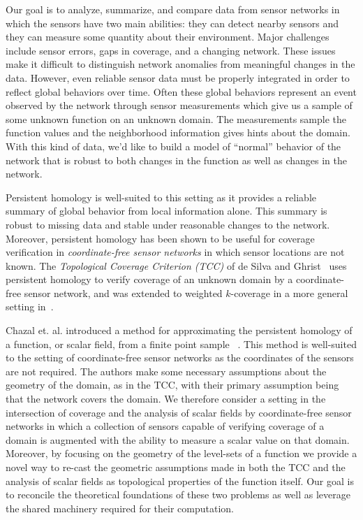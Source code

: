 Our goal is to analyze, summarize, and compare data from sensor networks in which the sensors have two main abilities: they can detect nearby sensors and they can measure some quantity about their environment.
Major challenges include sensor errors, gaps in coverage, and a changing network.
These issues make it difficult to distinguish network anomalies from meaningful changes in the data.
However, even reliable sensor data must be properly integrated in order to reflect global behaviors over time.
Often these global behaviors represent an event observed by the network through sensor measurements which give us a sample of some unknown function on an unknown domain.
The measurements sample the function values and the neighborhood information gives hints about the domain.
With this kind of data, we'd like to build a model of ``normal'' behavior of the network that is robust to both changes in the function as well as changes in the network.

Persistent homology is well-suited to this setting as it provides a reliable summary of global behavior from local information alone.
This summary is robust to missing data and stable under reasonable changes to the network.
Moreover, persistent homology has been shown to be useful for coverage verification in \emph{coordinate-free sensor networks} in which sensor locations are not known.
The \emph{Topological Coverage Criterion (TCC)} of de Silva and Ghrist~\cite{desilva07coverage} uses persistent homology to verify coverage of an unknown domain by a coordinate-free sensor network, and was extended to weighted $k$-coverage in a more general setting in~\cite{cavanna2017when}.

Chazal et. al. introduced a method for approximating the persistent homology of a function, or scalar field, from a finite point sample~\cite{chazal09analysis} .
This method is well-suited to the setting of coordinate-free sensor networks as the coordinates of the sensors are not required.
The authors make some necessary assumptions about the geometry of the domain, as in the TCC, with their primary assumption being that the network covers the domain.
We therefore consider a setting in the intersection of coverage and the analysis of scalar fields by coordinate-free sensor networks in which a collection of sensors capable of verifying coverage of a domain is augmented with the ability to measure a scalar value on that domain.
Moreover, by focusing on the geometry of the level-sets of a function we provide a novel way to re-cast the geometric assumptions made in both the TCC and the analysis of scalar fields as topological properties of the function itself.
Our goal is to reconcile the theoretical foundations of these two problems as well as leverage the shared machinery required for their computation.


